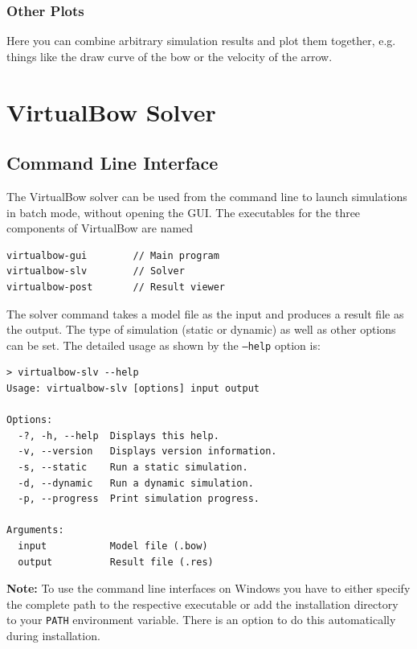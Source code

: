 \documentclass[12pt]{article}
\begin{document}
\subsubsection{Other Plots} Here you can combine arbitrary simulation results and plot them together, e.g. things like the draw curve of the bow or the velocity of the arrow.

\newpage
\section{VirtualBow Solver}

\subsection{Command Line Interface}

The VirtualBow solver can be used from the command line to launch simulations in batch mode, without opening the GUI.
The executables for the three components of VirtualBow are named

\begin{framed}
\begin{verbatim}
virtualbow-gui        // Main program
virtualbow-slv        // Solver
virtualbow-post       // Result viewer
\end{verbatim}
\end{framed}

The solver command takes a model file as the input and produces a result file as the output.
The type of simulation (static or dynamic) as well as other options can be set.
The detailed usage as shown by the \texttt{--help} option is:

\bigskip

\begin{framed}
\begin{verbatim}
> virtualbow-slv --help
Usage: virtualbow-slv [options] input output

Options:
  -?, -h, --help  Displays this help.
  -v, --version   Displays version information.
  -s, --static    Run a static simulation.
  -d, --dynamic   Run a dynamic simulation.
  -p, --progress  Print simulation progress.

Arguments:
  input           Model file (.bow)
  output          Result file (.res)
\end{verbatim}
\end{framed}

\bigskip

\textbf{Note:} To use the command line interfaces on Windows you have to either specify the complete path to the respective executable or add the installation directory to your \texttt{PATH} environment variable.
There is an option to do this automatically during installation.
\end{document}
